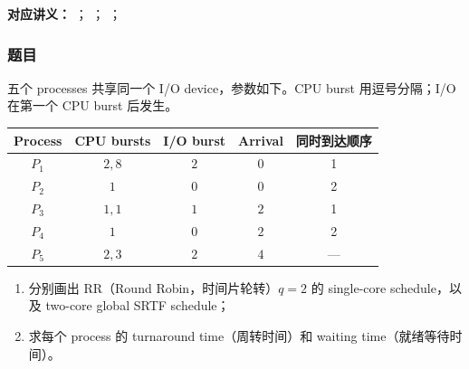
\textbf{对应讲义：}
；
；
；

\subsubsection*{题目}

五个 processes 共享同一个 I/O device，参数如下。CPU burst 用逗号分隔；I/O 在第一个 CPU burst 后发生。

\begin{center}
\small
\begin{tabular}{@{}ccccc@{}}
  \toprule
  Process & CPU bursts & I/O burst & Arrival & 同时到达顺序 \\
  \midrule
  $P_1$ & $2,8$ & $2$ & $0$ & 1 \\
  $P_2$ & $1$   & $0$ & $0$ & 2 \\
  $P_3$ & $1,1$ & $1$ & $2$ & 1 \\
  $P_4$ & $1$   & $0$ & $2$ & 2 \\
  $P_5$ & $2,3$ & $2$ & $4$ & --- \\
  \bottomrule
\end{tabular}
\end{center}

\begin{enumerate}[label=(\alph*)]
  \item 分别画出 RR（Round Robin，时间片轮转）$q=2$ 的 single-core schedule，以及 two-core global SRTF schedule；
  \item 求每个 process 的 turnaround time（周转时间）和 waiting time（就绪等待时间）。
\end{enumerate}

